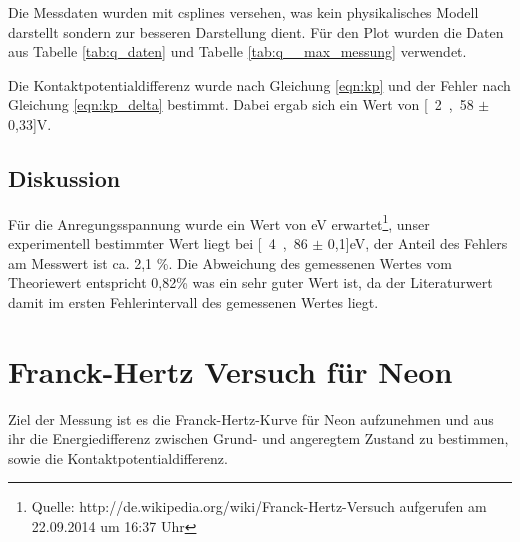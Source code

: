 \documentclass[12pt,a4paper]{article}
\begin{document}
Die Messdaten wurden mit csplines versehen, was kein physikalisches Modell darstellt sondern zur besseren Darstellung dient. Für den Plot wurden die Daten aus Tabelle \ref{tab:q_daten} und Tabelle \ref{tab:q__max_messung} verwendet.

Die Kontaktpotentialdifferenz wurde nach Gleichung \ref{eqn:kp} und
der Fehler nach Gleichung \ref{eqn:kp_delta}  bestimmt. Dabei ergab sich ein Wert von \unit[2,58 $\pm$ 0,33]{V}.

\subsection{Diskussion}

Für die Anregungsspannung wurde ein Wert von \unit[4,9]{eV} erwartet\footnote{Quelle: http://de.wikipedia.org/wiki/Franck-Hertz-Versuch aufgerufen am 22.09.2014 um 16:37 Uhr}, unser experimentell bestimmter Wert liegt bei \unit[4,86 $\pm$ 0,1]{eV}, der Anteil des Fehlers am Messwert ist ca. 2,1 \%. Die Abweichung des gemessenen Wertes vom Theoriewert entspricht 0,82\% was ein sehr guter Wert ist, da der Literaturwert damit im ersten Fehlerintervall des gemessenen Wertes liegt.

\section{Franck-Hertz Versuch für Neon}
Ziel der Messung ist es die Franck-Hertz-Kurve für Neon aufzunehmen und aus ihr die Energiedifferenz zwischen Grund- und angeregtem Zustand zu bestimmen, sowie die Kontaktpotentialdifferenz.
\end{document}
